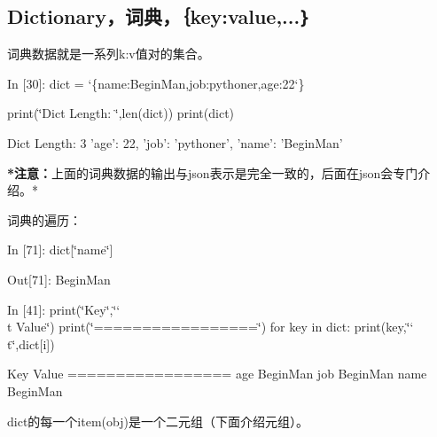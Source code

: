 \documentclass[letterpaper,10pt,english]{sphinxmanual}
\def\PYGZbs{\char`\\}
\def\PYGZob{\char`\{}
\def\PYGZcb{\char`\}}
\def\PYGZsq{\char`\'}
\def\PYGZdq{\char`\"}
\renewcommand\PYGZsq{\textquotesingle}
\begin{document}
\subsection{Dictionary，词典，｛key:value,...｝}
\label{pystart_databasic:Dictionary_uff0c_u8bcd_u5178_uff0c_uff5bkey:value,..._uff5d}
词典数据就是一系列k:v值对的集合。

\begin{OriginalVerbatim}[commandchars=\\\{\}]
\textcolor{nbsphinxin}{In [30]: }dict = \PYGZob{}\PYGZsq{}name\PYGZsq{}:\PYGZsq{}BeginMan\PYGZsq{},\PYGZsq{}job\PYGZsq{}:\PYGZsq{}pythoner\PYGZsq{},\PYGZsq{}age\PYGZsq{}:22\PYGZcb{}
         
         print(\PYGZdq{}Dict Length: \PYGZdq{},len(dict))
         print(dict)
\end{OriginalVerbatim}
\begin{OriginalVerbatim}[commandchars=\\\{\}]
Dict Length:  3
{'age': 22, 'job': 'pythoner', 'name': 'BeginMan'}
\end{OriginalVerbatim}
\textbf{*注意：}上面的词典数据的输出与json表示是完全一致的，后面在json会专门介绍。*

词典的遍历：

\begin{OriginalVerbatim}[commandchars=\\\{\}]
\textcolor{nbsphinxin}{In [71]: }dict[\PYGZdq{}name\PYGZdq{}]
\end{OriginalVerbatim}

\begin{OriginalVerbatim}[commandchars=\\\{\}]
\textcolor{nbsphinxout}{Out[71]: }\PYGZsq{}BeginMan\PYGZsq{}
\end{OriginalVerbatim}

\begin{OriginalVerbatim}[commandchars=\\\{\}]
\textcolor{nbsphinxin}{In [41]: }print(\PYGZdq{}Key\PYGZdq{},\PYGZdq{}\PYGZbs{}t Value\PYGZdq{})
         print(\PYGZdq{}=================\PYGZdq{})
         for key in dict:
             print(key,\PYGZdq{}\PYGZbs{}t\PYGZdq{},dict[i])
\end{OriginalVerbatim}
\begin{OriginalVerbatim}[commandchars=\\\{\}]
Key      Value
=================
age      BeginMan
job      BeginMan
name     BeginMan
\end{OriginalVerbatim}
dict的每一个item(obj)是一个二元组（下面介绍元组）。
\end{document}
